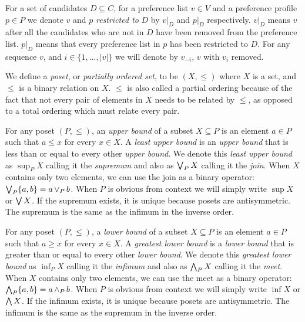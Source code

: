 	\begin{definition}
		For a set of candidates $D \subseteq C$, for a preference list $v \in V$ and a preference profile $p \in P$ we denote $v$ and $p$ \emph{restricted to} $D$ by $v|_D$ and $p|_D$ respectively. $v|_D$ means $v$ after all the candidates who are not in $D$ have been removed from the preference list. $p|_D$ means that every preference list in $p$ has been restricted to $D$. For any sequence $v$, and $i \in \{1, \ldots, |v|\}$ we will denote by $v_{-i}$, $v$ with $v_i$ removed.
	\end{definition}

	\begin{definition}
		We define a \emph{poset}, or \emph{partially ordered set}, to be $(X, \le)$ where $X$ is a set, and $\le$ is a binary relation on $X$. $\le$ is also called a partial ordering because of the fact that not every pair of elements in $X$ needs to be related by $\le$, as opposed to a total ordering which must relate every pair.
	\end{definition}

	\begin{definition}
		For any poset $(P, \le)$, an \emph{upper bound} of a subset $X \subseteq P$ is an element $a \in P$ such that $a \le x$ for every $x \in X$. A \emph{least upper bound} is an \emph{upper bound} that is less than or equal to every other \emph{upper bound}. We denote this \emph{least upper bound} as $\sup_P X$ calling it the \emph{supremum} \cite{birkhoﬀ1967lattice} and also as $\operatorname{\bigvee}_P X$ calling it the \emph{join}. When $X$ contains only two elements, we can use the join as a binary operator: $\operatorname{\bigvee}_P \{a, b\} = a \operatorname{\vee}_P b$. When $P$ is obvious from context we will simply write $\sup X$ or $\operatorname{\bigvee} X$. If the supremum exists, it is unique because posets are antisymmetric. The supremum is the same as the infimum in the inverse order.
	\end{definition}

	\begin{definition}
		For any poset $(P, \le)$, a \emph{lower bound} of a subset $X \subseteq P$ is an element $a \in P$ such that $a \ge x$ for every $x \in X$. A \emph{greatest lower bound} is a \emph{lower bound} that is greater than or equal to every other \emph{lower bound}. We denote this \emph{greatest lower bound} as $\inf_P X$ calling it the \emph{infimum} \cite{birkhoﬀ1967lattice} and also as $\operatorname{\bigwedge}_P X$ calling it the \emph{meet}. When $X$ contains only two elements, we can use the meet as a binary operator: $\operatorname{\bigwedge}_P \{a, b\} = a \operatorname{\wedge}_P b$. When $P$ is obvious from context we will simply write $\inf X$ or $\operatorname{\bigwedge} X$. If the infimum exists, it is unique because posets are antisymmetric. The infimum is the same as the supremum in the inverse order.
	\end{definition}

